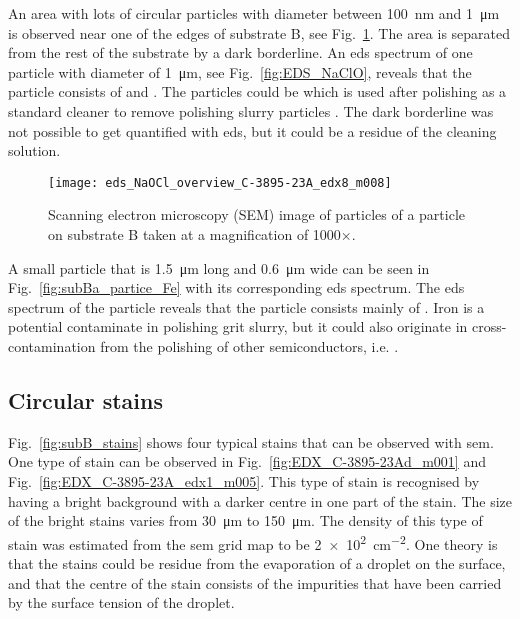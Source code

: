 An area with lots of circular particles with diameter between \SI{100}{\nano\metre} and \SI{1}{\micro\metre} is observed near one of the edges of substrate B, see Fig.~\ref{fig:eds_NaOCl_overview}. The area is separated from the rest of the substrate by a dark borderline. An \ac{eds} spectrum of one particle with diameter of \SI{1}{\micro\metre}, see Fig.~\ref{fig:EDS_NaClO}, reveals that the particle consists of  and . The particles could be  which is used after polishing as a standard cleaner to remove polishing slurry particles \citep{benson2015as-received}. The dark borderline was not possible to get quantified with \ac{eds}, but it could be a residue of the cleaning solution.

\begin{figure}
    \centering
    \texttt{[image: eds\_NaOCl\_overview\_C-3895-23A\_edx8\_m008]}
    \caption{Scanning electron microscopy (SEM) image of particles of a particle on substrate B taken at a magnification of 1000$\times$.}
    \label{fig:eds_NaOCl_overview}
\end{figure}

A small particle that is \SI{1.5}{\micro\metre} long and \SI{0.6}{\micro\metre} wide can be seen in Fig.~\ref{fig:subBa_partice_Fe} with its corresponding \ac{eds} spectrum. The \ac{eds} spectrum of the particle reveals that the particle consists mainly of . Iron is a potential contaminate in polishing grit slurry, but it could also originate in cross-contamination from the polishing of other semiconductors, i.e.  \citep{benson2015as-received}.

\subsection{Circular stains}
Fig.~\ref{fig:subB_stains} shows four typical stains that can be observed with \ac{sem}. One type of stain can be observed in Fig.~\ref{fig:EDX_C-3895-23Ad_m001} and Fig.~\ref{fig:EDX_C-3895-23A_edx1_m005}. This type of stain is recognised by having a bright background with a darker centre in one part of the stain. The size of the bright stains varies from \SI{30}{\micro\metre} to \SI{150}{\micro\metre}. The density of this type of stain was estimated from the \ac{sem} grid map to be \SI{2e2}{\centi\metre^{-2}}. One theory  is that the stains could be residue from the evaporation of a droplet on the surface, and that the centre of the stain consists of the impurities that have been carried by the surface tension of the droplet. 

